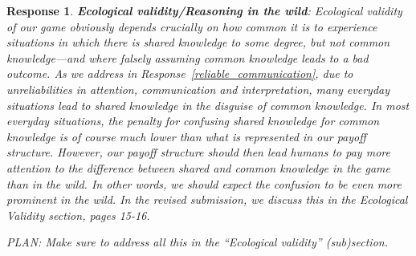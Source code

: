 \documentclass[a4paper]{article}
\newtheorem{response}{Response}
\begin{document}
 \begin{response}
{\bfseries Ecological validity/Reasoning in the wild}: Ecological validity of our game obviously depends crucially on how common it is to experience situations in which there is shared knowledge to some degree, but not common knowledge---and where falsely assuming common knowledge leads to a bad outcome. As we address in Response~\ref{reliable_communication}, due to unreliabilities in attention, communication and interpretation, many everyday situations lead to shared knowledge in the disguise of common knowledge. In most everyday situations, the penalty for confusing shared knowledge for common knowledge is of course much lower than what is represented in our payoff structure. However, our payoff structure should then lead humans to pay \emph{more} attention to the difference between shared and common knowledge in the game than in the wild. In other words, we should expect the confusion to be even more prominent in the wild. In the revised submission, we discuss this in the Ecological Validity section, pages 15-16.

PLAN: Make sure to address all this in the ``Ecological validity'' (sub)section.  
 \end{response}

 
\end{document}
